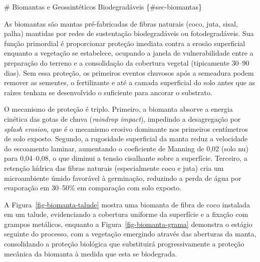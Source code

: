 \documentclass[
  portuguese,
  11pt,
  a4paper,
  open=any]{scrbook}
\begin{document}
\# Biomantas e Geossintéticos Biodegradáveis \{\#sec-biomantas\}

As biomantas são mantas pré-fabricadas de fibras naturais (coco, juta,
sisal, palha) mantidas por redes de sustentação biodegradáveis ou
fotodegradáveis. Sua função primordial é proporcionar proteção imediata
contra a erosão superficial enquanto a vegetação se estabelece, ocupando
a janela de vulnerabilidade entre a preparação do terreno e a
consolidação da cobertura vegetal (tipicamente 30--90 dias). Sem essa
proteção, os primeiros eventos chuvosos após a semeadura podem remover
as sementes, o fertilizante e até a camada superficial do solo antes que
as raízes tenham se desenvolvido o suficiente para ancorar o substrato.

O mecanismo de proteção é triplo. Primeiro, a biomanta absorve a energia
cinética das gotas de chuva (\emph{raindrop impact}), impedindo a
desagregação por \emph{splash erosion}, que é o mecanismo erosivo
dominante nos primeiros centímetros de solo exposto. Segundo, a
rugosidade superficial da manta reduz a velocidade do escoamento
laminar, aumentando o coeficiente de Manning de 0,02 (solo nu) para
0,04--0,08, o que diminui a tensão cisalhante sobre a superfície.
Terceiro, a retenção hídrica das fibras naturais (especialmente coco e
juta) cria um microambiente úmido favorável à germinação, reduzindo a
perda de água por evaporação em 30--50\% em comparação com solo exposto.

A Figura~\ref{fig-biomanta-talude} mostra uma biomanta de fibra de coco
instalada em um talude, evidenciando a cobertura uniforme da superfície
e a fixação com grampos metálicos, enquanto a
Figura~\ref{fig-biomanta-grama} demonstra o estágio seguinte do
processo, com a vegetação emergindo através das aberturas da manta,
consolidando a proteção biológica que substituirá progressivamente a
proteção mecânica da biomanta à medida que esta se biodegrada.
\end{document}
